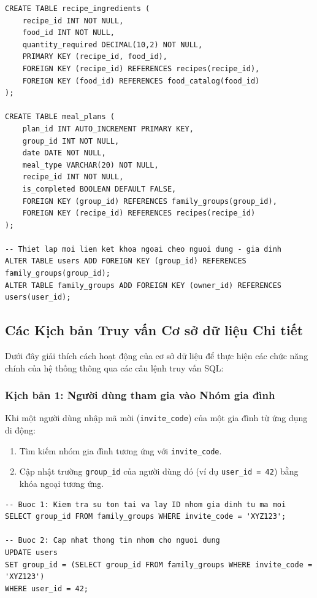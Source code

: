 \documentclass[../main.tex]{subfiles}
\begin{document}
\begin{lstlisting}[style=mysqlstyle, caption=SQL Schema Definition for NaviMart]
CREATE TABLE recipe_ingredients (
    recipe_id INT NOT NULL,
    food_id INT NOT NULL,
    quantity_required DECIMAL(10,2) NOT NULL,
    PRIMARY KEY (recipe_id, food_id),
    FOREIGN KEY (recipe_id) REFERENCES recipes(recipe_id),
    FOREIGN KEY (food_id) REFERENCES food_catalog(food_id)
);

CREATE TABLE meal_plans (
    plan_id INT AUTO_INCREMENT PRIMARY KEY,
    group_id INT NOT NULL,
    date DATE NOT NULL,
    meal_type VARCHAR(20) NOT NULL,
    recipe_id INT NOT NULL,
    is_completed BOOLEAN DEFAULT FALSE,
    FOREIGN KEY (group_id) REFERENCES family_groups(group_id),
    FOREIGN KEY (recipe_id) REFERENCES recipes(recipe_id)
);

-- Thiet lap moi lien ket khoa ngoai cheo nguoi dung - gia dinh
ALTER TABLE users ADD FOREIGN KEY (group_id) REFERENCES family_groups(group_id);
ALTER TABLE family_groups ADD FOREIGN KEY (owner_id) REFERENCES users(user_id);
\end{lstlisting}

\subsection{Các Kịch bản Truy vấn Cơ sở dữ liệu Chi tiết}
Dưới đây giải thích cách hoạt động của cơ sở dữ liệu để thực hiện các chức năng chính của hệ thống thông qua các câu lệnh truy vấn SQL:

\subsubsection{Kịch bản 1: Người dùng tham gia vào Nhóm gia đình}
Khi một người dùng nhập mã mời (\texttt{invite\_code}) của một gia đình từ ứng dụng di động:
\begin{enumerate}
    \item Tìm kiếm nhóm gia đình tương ứng với \texttt{invite\_code}.
    \item Cập nhật trường \texttt{group\_id} của người dùng đó (ví dụ \texttt{user\_id = 42}) bằng khóa ngoại tương ứng.
\end{enumerate}

\begin{lstlisting}[style=mysqlstyle, caption=SQL Update User Group on Joining Family]
-- Buoc 1: Kiem tra su ton tai va lay ID nhom gia dinh tu ma moi
SELECT group_id FROM family_groups WHERE invite_code = 'XYZ123';

-- Buoc 2: Cap nhat thong tin nhom cho nguoi dung
UPDATE users 
SET group_id = (SELECT group_id FROM family_groups WHERE invite_code = 'XYZ123')
WHERE user_id = 42;
\end{lstlisting}
\end{document}

